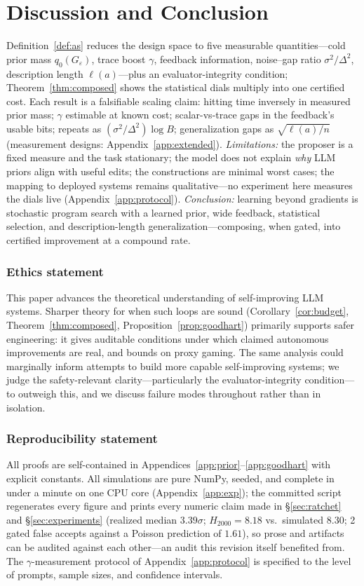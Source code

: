 \documentclass{article}
\theoremstyle{plain}
\theoremstyle{definition}
\theoremstyle{remark}
\newcommand{\len}{\ell}
\newcommand{\eps}{\varepsilon}
\begin{document}
\section{Discussion and Conclusion}
\label{sec:discussion}

Definition~\ref{def:as} reduces the design space to five measurable quantities---cold prior mass $q_0(G_\eps)$, trace boost $\gamma$, feedback information, noise--gap ratio $\sigma^2/\Delta^2$, description length $\len(a)$---plus an evaluator-integrity condition; Theorem~\ref{thm:composed} shows the statistical dials multiply into one certified cost. Each result is a falsifiable scaling claim: hitting time inversely in measured prior mass; $\gamma$ estimable at known cost; scalar-vs-trace gaps in the feedback's usable bits; repeats as $(\sigma^2/\Delta^2)\log B$; generalization gaps as $\sqrt{\len(a)/n}$ (measurement designs: Appendix~\ref{app:extended}). \emph{Limitations:} the proposer is a fixed measure and the task stationary; the model does not explain \emph{why} LLM priors align with useful edits; the constructions are minimal worst cases; the mapping to deployed systems remains qualitative---no experiment here measures the dials live (Appendix~\ref{app:protocol}). \emph{Conclusion:} learning beyond gradients is stochastic program search with a learned prior, wide feedback, statistical selection, and description-length generalization---composing, when gated, into certified improvement at a compound rate.

\subsubsection*{Ethics statement}
This paper advances the theoretical understanding of self-improving LLM systems. Sharper theory for when such loops are sound (Corollary~\ref{cor:budget}, Theorem~\ref{thm:composed}, Proposition~\ref{prop:goodhart}) primarily supports safer engineering: it gives auditable conditions under which claimed autonomous improvements are real, and bounds on proxy gaming. The same analysis could marginally inform attempts to build more capable self-improving systems; we judge the safety-relevant clarity---particularly the evaluator-integrity condition---to outweigh this, and we discuss failure modes throughout rather than in isolation.

\subsubsection*{Reproducibility statement}
All proofs are self-contained in Appendices~\ref{app:prior}--\ref{app:goodhart} with explicit constants. All simulations are pure NumPy, seeded, and complete in under a minute on one CPU core (Appendix~\ref{app:exp}); the committed script regenerates every figure and prints every numeric claim made in \S\ref{sec:ratchet} and \S\ref{sec:experiments} (realized median $3.39\sigma$; $H_{2000} = 8.18$ vs.\ simulated $8.30$; 2 gated false accepts against a Poisson prediction of $1.61$), so prose and artifacts can be audited against each other---an audit this revision itself benefited from. The $\gamma$-measurement protocol of Appendix~\ref{app:protocol} is specified to the level of prompts, sample sizes, and confidence intervals.
\end{document}
